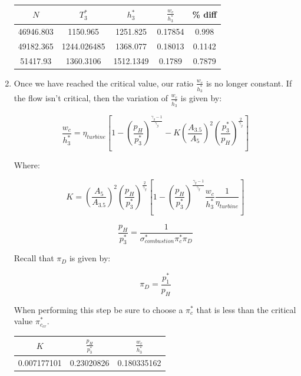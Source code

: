 \documentclass[titlepage]{article}
\begin{document}
\begin{enumerate}
  \begin{center}
    \begin{tabular}{|c|c|c|c|c|}
      \hline
      $N$ & $T_{3}^{*}$ & $h_{3}^{*}$ & $\frac{w_{c}}{h_{3}^{*}}$ & \% diff \\
      \hline
      46946.803 & 1150.965 & 1251.825 & 0.17854 & 0.998 \\
      \hline
      49182.365 & 1244.026485 & 1368.077 &	0.18013	& 0.1142 \\
      \hline
      51417.93 & 1360.3106 & 1512.1349	& 0.1789	& 0.7879 \\
      \hline
    \end{tabular}
  \end{center}


  \item Once we have reached the critical value, our ratio $\frac{w_{c}}{h_{3}^{*}}$ is no longer constant. If the flow isn't critical,
  then the variation of $\frac{w_{c}}{h_{3}^{*}}$ is given by:

  \begin{equation}
    \frac{w_{c}}{h_{3}^{*}} = \eta_{turbine} \left[ 1 - \left(\frac{p_{H}}{p_{3}^{*}}\right)^{\frac{\gamma_{g}-1}{\gamma_{g}}} - K \left(\frac{A_{3.5}}{A_{5}}\right)^{2} \left(\frac{p_{3}^{*}}{p_{H}}\right)^{\frac{2}{\gamma_{g}}} \right] 
  \end{equation}
  
  Where:

  \begin{equation}
    K = \left(\frac{A_{5}}{A_{3.5}}\right)^{2} \left(\frac{p_{H}}{p_{3}^{*}}\right)^{\frac{2}{\gamma_{g}}}\left[1 - \left(\frac{p_{H}}{p_{3}^{*}}\right)^{\frac{\gamma_{g}-1}{\gamma_{g}}} \frac{w_{c}}{h_{3}^{*}} \frac{1}{\eta_{turbine}}\right] 
  \end{equation}

  \begin{equation}
    \frac{p_{H}}{p_{3}^{*}} = \frac{1}{\sigma_{combustion}^{*} \pi_{c}^{*} \pi_{D}}
  \end{equation}

  Recall that $\pi_{D}$ is given by:

  \begin{equation}
    \pi_{D} = \frac{p_{1}^{*}}{p_{H}}
  \end{equation}

  When performing this step be sure to choose a $\pi_{c}^{*}$ that is less than the critical value $\pi_{c_{cr}}^{*}$.

  \begin{center}
    \begin{tabular}{|c|c|c|}
      \hline
      $K$ & $\frac{p_{H}}{p_{3}^{*}}$ & $\frac{w_{c}}{h_{3}^{*}}$ \\
      \hline
      0.007177101 & 0.23020826 & 0.180335162\\
      \hline
    \end{tabular}
  \end{center}


\end{enumerate}
\end{document}
